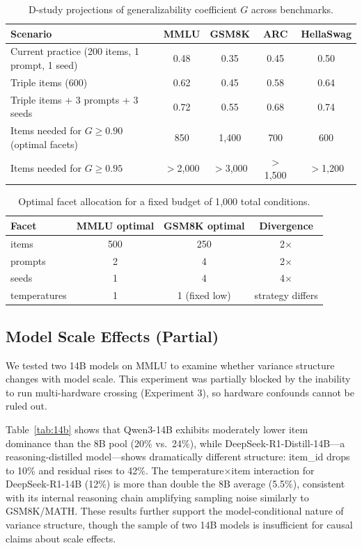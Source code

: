 \documentclass[letterpaper]{article}
\begin{document}
\begin{table}[t]
\centering
\caption{D-study projections of generalizability coefficient $G$ across benchmarks.}
\label{tab:dstudy}
\small
\begin{tabular}{lcccc}
\toprule
Scenario & MMLU & GSM8K & ARC & HellaSwag \\
\midrule
Current practice (200 items, 1 prompt, 1 seed) & 0.48 & 0.35 & 0.45 & 0.50 \\
Triple items (600)                              & 0.62 & 0.45 & 0.58 & 0.64 \\
Triple items + 3 prompts + 3 seeds              & 0.72 & 0.55 & 0.68 & 0.74 \\
\midrule
Items needed for $G \geq 0.90$ (optimal facets) & 850  & 1{,}400 & 700 & 600 \\
Items needed for $G \geq 0.95$                  & $>$2{,}000 & $>$3{,}000 & $>$1{,}500 & $>$1{,}200 \\
\bottomrule
\end{tabular}
\end{table}

\begin{table}[t]
\centering
\caption{Optimal facet allocation for a fixed budget of 1{,}000 total conditions.}
\label{tab:allocation}
\small
\begin{tabular}{lccc}
\toprule
Facet & MMLU optimal & GSM8K optimal & Divergence \\
\midrule
items        & 500 & 250 & 2$\times$ \\
prompts      &   2 &   4 & 2$\times$ \\
seeds        &   1 &   4 & 4$\times$ \\
temperatures &   1 & 1 (fixed low) & strategy differs \\
\bottomrule
\end{tabular}
\end{table}


\subsection{Model Scale Effects (Partial)}

We tested two 14B models on MMLU to examine whether variance structure changes with model scale.
This experiment was partially blocked by the inability to run multi-hardware crossing (Experiment 3), so hardware confounds cannot be ruled out.

Table~\ref{tab:14b} shows that Qwen3-14B exhibits moderately lower item dominance than the 8B pool (20\% vs.\ 24\%), while DeepSeek-R1-Distill-14B---a reasoning-distilled model---shows dramatically different structure: item\_id drops to 10\% and residual rises to 42\%.
The temperature$\times$item interaction for DeepSeek-R1-14B (12\%) is more than double the 8B average (5.5\%), consistent with its internal reasoning chain amplifying sampling noise similarly to GSM8K/MATH.
These results further support the model-conditional nature of variance structure, though the sample of two 14B models is insufficient for causal claims about scale effects.
\end{document}

